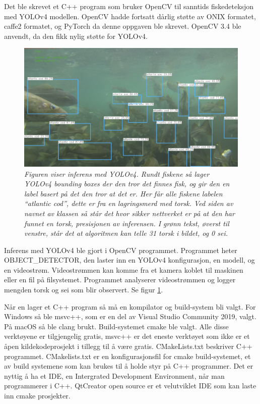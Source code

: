 Det ble skrevet et C++ program som bruker OpenCV til sanntids fiskedeteksjon med YOLOv4 modellen. OpenCV hadde fortsatt dårlig støtte av ONIX formatet, caffe2 formatet, og PyTorch da denne oppgaven ble skrevet. OpenCV 3.4 ble anvendt, da den fikk nylig støtte for YOLOv4. \cite{Batanina 2020}

\begin{figure}
\begin{center} 
\includegraphics[scale=0.35]{figures/inference_yolo}
\caption{\small \sl Figuren viser inferens med YOLOv4. Rundt fiskene så lager YOLOv4 bounding boxes der den tror det finnes fisk, og gir den en label basert på det den tror at det er. Her får alle fiskene labelen ``atlantic cod'', dette er fra en lagringsmerd med torsk. Ved siden av navnet av klassen så står det hvor sikker nettverket er på at den har funnet en torsk, presisjonen av inferensen. I grønn tekst, øverst til venstre, står det at algoritmen kan telle 31 torsk i bildet, og 0 sei. \label{fig:yolo_inference}} 
\end{center} 
\end{figure} 

Inferens med YOLOv4 ble gjort i OpenCV programmet. Programmet heter OBJECT\_DETECTOR, den laster inn en YOLOv4 konfigurasjon, en modell, og en videostrøm. Videostrømmen kan komme fra et kamera koblet til maskinen eller en fil på filsystemet. Programmet analyserer videostrømmen og logger mengden torsk og sei som blir observert. Se figur \ref{fig:yolo_inference}.

Når en lager et C++ program så må en kompilator og build-system bli valgt. For Windows så ble msvc++, som er en del av Visual Studio Community 2019, valgt. På macOS så ble clang brukt. Build-systemet cmake ble valgt. Alle disse verktøyene er tilgjengelig gratis, msvc++ er det eneste verktøyet som ikke er et åpen kildekodeprosjekt i tillegg til å være gratis. CMakeLists.txt beskriver C++ programmet. CMakelists.txt er en konfigurasjonsfil for cmake build-systemet, et av build systemene som kan brukes til å holde styr på C++ programmer. Det er nyttig å ha et IDE, en Intergrated Development Environment, når man programmerer i C++. QtCreator open source er et velutviklet IDE som kan laste inn cmake prosjekter.

